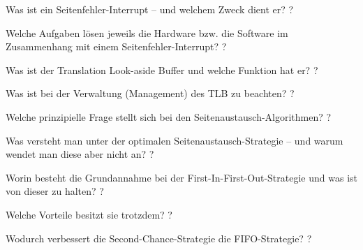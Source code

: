\documentclass[avery5371]{flashcards}
\begin{document}
\begin{flashcard}[Speichermanagement]{Was ist ein Seitenfehler-Interrupt – und welchem Zweck dient er? }
    ?
\end{flashcard}

\begin{flashcard}[Speichermanagement]{Welche Aufgaben lösen jeweils die Hardware bzw. die Software im Zusammenhang mit einem Seitenfehler-Interrupt?}
    ?
\end{flashcard}

\begin{flashcard}[Speichermanagement]{Was ist der Translation Look-aside Buffer und welche Funktion hat er? }
    ?
\end{flashcard}

\begin{flashcard}[Speichermanagement]{Was ist bei der Verwaltung (Management) des TLB zu beachten? }
    ?
\end{flashcard}

\begin{flashcard}[Speichermanagement]{Welche prinzipielle Frage stellt sich bei den Seitenaustausch-Algorithmen?}
    ?
\end{flashcard}

\begin{flashcard}[Speichermanagement]{Was versteht man unter der optimalen Seitenaustausch-Strategie – und warum wendet man diese aber nicht an?}
    ?
\end{flashcard}

\begin{flashcard}[Speichermanagement]{Worin besteht die Grundannahme bei der First-In-First-Out-Strategie und was ist von dieser zu halten? }
    ?
\end{flashcard}

\begin{flashcard}[Speichermanagement]{Welche Vorteile besitzt sie trotzdem? }
    ?
\end{flashcard}

\begin{flashcard}[Speichermanagement]{Wodurch verbessert die Second-Chance-Strategie die FIFO-Strategie?}
    ?
\end{flashcard}
\end{document}
